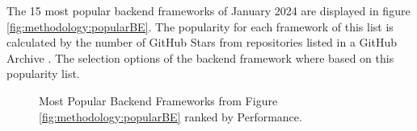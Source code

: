 The 15 most popular backend frameworks of January 2024 are displayed in figure \ref{fig:methodology:popularBE}. The popularity for each framework of this list is calculated by the number of GitHub Stars from repositories listed in a GitHub Archive \cite{backend:popularity}. The selection options of the backend framework where based on this popularity list. 
\begin{figure}[htbp]
  \myfloatalign
   \caption{Most Popular Backend Frameworks from Figure \ref{fig:methodology:popularBE} ranked by Performance.}
   \label{fig:methodology:benchmarkBE}
\end{figure}

